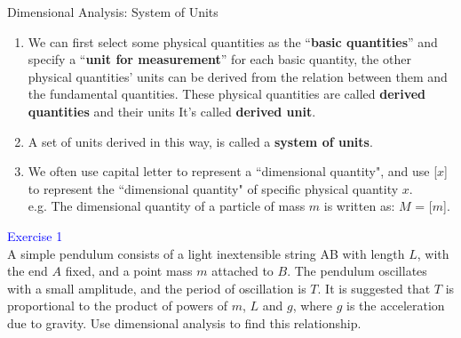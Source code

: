 \documentclass{beamer}
\begin{document}
\begin{frame}{Dimensional Analysis: System of Units}
\begin{enumerate}
  \item We can first select some physical quantities as the ``\textbf{basic quantities}”
  and specify a ``\textbf{unit for measurement}” for each basic quantity,
  the other physical quantities' units can be derived from the
  relation between them and the fundamental
  quantities. These physical quantities are called \textbf{derived quantities}
  and their units It's called \textbf{derived unit}.
  \item A set of units derived in this way, is called a \textbf{system of units}.
  \item We often use capital letter to represent a ``dimensional quantity", and
  use [$x$] to represent the ``dimensional quantity" of specific physical quantity $x$.\\
  e.g. The dimensional quantity of a particle of mass $m$ is written as: $M$ = [$m$].
\end{enumerate}
\end{frame}

\begin{frame}
  \textcolor{blue}{Exercise 1}\\
  A simple pendulum consists of a light inextensible string AB with length $L$, with the end $A$ fixed, and a point mass $m$ attached to $B$. The pendulum oscillates with a small amplitude, and the period of oscillation is $T$. It is suggested that $T$ is proportional to the product of powers of $m$, $L$ and $g$, where $g$ is the acceleration due to gravity. Use dimensional analysis to find this relationship. 
\end{frame}
\end{document}
